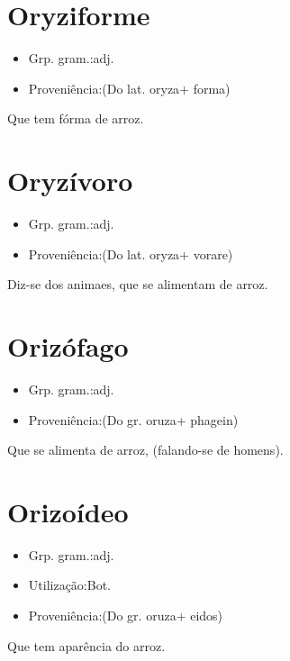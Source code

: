\section{Oryziforme}
\begin{itemize}
\item {Grp. gram.:adj.}
\end{itemize}
\begin{itemize}
\item {Proveniência:(Do lat. \textunderscore oryza\textunderscore  + \textunderscore forma\textunderscore )}
\end{itemize}
Que tem fórma de arroz.
\section{Oryzívoro}
\begin{itemize}
\item {Grp. gram.:adj.}
\end{itemize}
\begin{itemize}
\item {Proveniência:(Do lat. \textunderscore oryza\textunderscore  + \textunderscore vorare\textunderscore )}
\end{itemize}
Diz-se dos animaes, que se alimentam de arroz.
\section{Orizófago}
\begin{itemize}
\item {Grp. gram.:adj.}
\end{itemize}
\begin{itemize}
\item {Proveniência:(Do gr. \textunderscore oruza\textunderscore  + \textunderscore phagein\textunderscore )}
\end{itemize}
Que se alimenta de arroz, (falando-se de homens).
\section{Orizoídeo}
\begin{itemize}
\item {Grp. gram.:adj.}
\end{itemize}
\begin{itemize}
\item {Utilização:Bot.}
\end{itemize}
\begin{itemize}
\item {Proveniência:(Do gr. \textunderscore oruza\textunderscore  + \textunderscore eidos\textunderscore )}
\end{itemize}
Que tem aparência do arroz.
